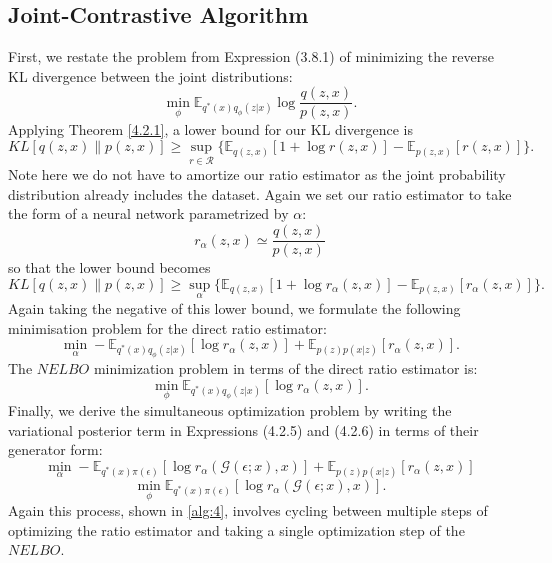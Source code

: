 \documentclass[honours,12pt]{unswthesis}
\newcommand{\E}{\mathbb{E}}
\numberwithin{equation}{section}
\theoremstyle{definition}
\begin{document}
\subsection{Joint-Contrastive Algorithm}\label{sec:4.2.3}
First, we restate the problem from Expression (3.8.1) of minimizing the reverse KL divergence between the joint distributions:
\[\min_\phi \mathbb{E}_{q^*(x)q_\phi(z|x)}\log \frac{q(z,x)}{p(z,x)}.\]
Applying Theorem \ref{4.2.1}, a lower bound for our KL divergence is
\[KL[q(z,x)\|p(z,x)]\geq \sup_{r\in \mathcal{R}}\{\mathbb{E}_{q(z,x)}[1+\log r(z,x)]-\mathbb{E}_{p(z,x)}[r(z,x)]\}.\]
Note here we do not have to amortize our ratio estimator as the joint probability distribution already includes the dataset. Again we set our ratio estimator to take the form of a neural network parametrized by $\alpha$:
\[r_\alpha(z,x)\simeq \frac{q(z,x)}{p(z,x)}\]
so that the lower bound becomes
\[KL[q(z,x)\|p(z,x)]\geq \sup_{\alpha}\{\mathbb{E}_{q(z,x)}[1+\log r_\alpha(z,x)]-\mathbb{E}_{p(z,x)}[r_\alpha(z,x)]\}.\]
Again taking the negative of this lower bound, we formulate the following minimisation problem for the direct ratio estimator:
\begin{equation}
\min_\alpha-\E_{q^*(x)q_\phi(z|x)}[\log r_\alpha(z,x)]+\E_{p(z)p(x|z)}[r_\alpha(z,x)].
\end{equation}
The $NELBO$ minimization problem in terms of the direct ratio estimator is:
\begin{equation}
\min_\phi \mathbb{E}_{q^*(x)q_\phi(z|x)}[\log r_\alpha(z,x)].
\end{equation}
Finally, we derive the simultaneous optimization problem by writing the variational posterior term in Expressions (4.2.5) and (4.2.6) in terms of their generator form:
\[\min_\alpha -\mathbb{E}_{q^*(x)\pi(\epsilon)}[\log r_\alpha(\mathcal{G}(\epsilon;x),x)]+\mathbb{E}_{p(z)p(x|z)}[r_\alpha(z,x)]\]
\[\min_\phi \mathbb{E}_{q^*(x)\pi(\epsilon)}[\log r_\alpha(\mathcal{G}(\epsilon;x),x)].\]
Again this process, shown in \autoref{alg:4}, involves cycling between multiple steps of optimizing the ratio estimator and taking a single optimization step of the $NELBO$.
\newpage
\end{document}
